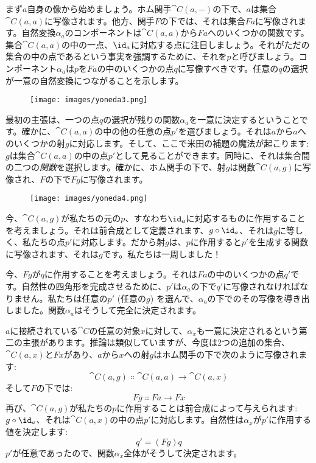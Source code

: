 まず$a$自身の像から始めましょう。ホム関手$\cat{C}(a, -)$の下で、$a$は集合$\cat{C}(a, a)$に写像されます。他方、関手$F$の下では、それは集合$F a$に写像されます。自然変換$\alpha_a$のコンポーネントは$\cat{C}(a, a)$から$F a$へのいくつかの関数です。集合$\cat{C}(a, a)$の中の一点、$\id_a$に対応する点に注目しましょう。それがただの集合の中の点であるという事実を強調するために、それを$p$と呼びましょう。コンポーネント$\alpha_a$は$p$を$F a$の中のいくつかの点$q$に写像すべきです。任意の$q$の選択が一意の自然変換につながることを示します。

\begin{figure}[H]
  \centering
  \texttt{[image: images/yoneda3.png]}
\end{figure}

\noindent
最初の主張は、一つの点$q$の選択が残りの関数$\alpha_a$を一意に決定するということです。確かに、$\cat{C}(a, a)$の中の他の任意の点$p'$を選びましょう。それは$a$から$a$へのいくつかの射$g$に対応します。そして、ここで米田の補題の魔法が起こります: $g$は集合$\cat{C}(a, a)$の中の点$p'$として見ることができます。同時に、それは集合間の二つの\emph{関数}を選択します。確かに、ホム関手の下で、射$g$は関数$\cat{C}(a, g)$に写像され、$F$の下で$F g$に写像されます。

\begin{figure}[H]
  \centering
  \texttt{[image: images/yoneda4.png]}
\end{figure}

\noindent
今、$\cat{C}(a, g)$が私たちの元の$p$、すなわち$\id_a$に対応するものに作用することを考えましょう。それは前合成として定義されます、$g \circ \id_a$、それは$g$に等しく、私たちの点$p'$に対応します。だから射$g$は、$p$に作用すると$p'$を生成する関数に写像されます、それは$g$です。私たちは一周しました！

今、$F g$が$q$に作用することを考えましょう。それは$F a$の中のいくつかの点$q'$です。自然性の四角形を完成させるために、$p'$は$\alpha_a$の下で$q'$に写像されなければなりません。私たちは任意の$p'$ (任意の$g$) を選んで、$\alpha_a$の下でのその写像を導き出しました。関数$\alpha_a$はそうして完全に決定されます。

$a$に接続されている$\cat{C}$の任意の対象$x$に対して、$\alpha_x$も一意に決定されるという第二の主張があります。推論は類似していますが、今度は2つの追加の集合、$\cat{C}(a, x)$と$F x$があり、$a$から$x$への射$g$はホム関手の下で次のように写像されます: 
\[\cat{C}(a, g) \Colon \cat{C}(a, a) \to \cat{C}(a, x)\]
そして$F$の下では: 
\[F g \Colon F a \to F x\]
再び、$\cat{C}(a, g)$が私たちの$p$に作用することは前合成によって与えられます: $g \circ \id_a$、それは$\cat{C}(a, x)$の中の点$p'$に対応します。自然性は$\alpha_x$が$p'$に作用する値を決定します: 
\[q' = (F g) q\]
$p'$が任意であったので、関数$\alpha_x$全体がそうして決定されます。

